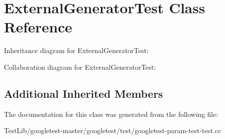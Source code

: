 \hypertarget{classExternalGeneratorTest}{}\section{External\+Generator\+Test Class Reference}
\label{classExternalGeneratorTest}


Inheritance diagram for External\+Generator\+Test\+:


Collaboration diagram for External\+Generator\+Test\+:
\subsection*{Additional Inherited Members}


The documentation for this class was generated from the following file\+:\begin{DoxyCompactItemize}
\item 
Test\+Lib/googletest-\/master/googletest/test/googletest-\/param-\/test-\/test.\+cc\end{DoxyCompactItemize}
